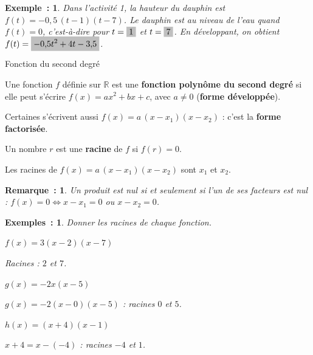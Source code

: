 \documentclass[12pt]{article}
\theoremstyle{break}
\newtheorem*{example}{Exemple~:}
\newtheorem*{examples}{Exemples~:}
\newtheorem*{remark}{Remarque~:}
\theoremstyle{inline}
\begin{document}
\begin{example}
  Dans l'activité 1, la hauteur du dauphin est $f(t) = -0{,}5\,(t - 1)(t - 7)$. Le dauphin est au niveau de l'eau quand $f(t) = 0$, c'est-à-dire pour $t = \hideM{1}$ et $t = \hideM{7}$. En développant, on obtient $f(t) = \hideM{-0{,}5t^2 + 4t - 3{,}5}$.
\end{example}

\begin{definition}{Fonction du second degré}{}
  \begin{multihide}
    Une fonction $f$ définie sur $\mathbb{R}$ est une \textbf{fonction polynôme du second degré} si elle peut s'écrire $f(x) = ax^2 + bx + c$, avec $a \neq 0$ (\textbf{forme développée}).

    Certaines s'écrivent aussi $f(x) = a\,(x - x_1)(x - x_2)$ : c'est la \textbf{forme factorisée}.

    Un nombre $r$ est une \textbf{racine} de $f$ si $f(r) = 0$.
  \end{multihide}
\end{definition}

\begin{proposition}{}{}
  \begin{multihide}
    Les racines de $f(x) = a\,(x - x_1)(x - x_2)$ sont $x_1$ et $x_2$.
  \end{multihide}
\end{proposition}

\begin{remark}
  Un produit est nul si et seulement si l'un de ses facteurs est nul : $f(x) = 0 \iff x - x_1 = 0$ ou $x - x_2 = 0$.
\end{remark}

\begin{examples}
  Donner les racines de chaque fonction.

  \medskip
  \begin{minipage}[t]{0.31\linewidth}
    $f(x) = 3(x - 2)(x - 7)$
    \begin{multihideW}[0.5em]
      Racines : $2$ et $7$.
    \end{multihideW}
  \end{minipage}
  \hfill
  \begin{minipage}[t]{0.31\linewidth}
    $g(x) = -2x(x - 5)$
    \begin{multihideW}[0.5em]
      $g(x) = -2(x - 0)(x - 5)$ : racines $0$ et $5$.
    \end{multihideW}
  \end{minipage}
  \hfill
  \begin{minipage}[t]{0.31\linewidth}
    $h(x) = (x + 4)(x - 1)$
    \begin{multihideW}[0.5em]
      $x + 4 = x - (-4)$ : racines $-4$ et $1$.
    \end{multihideW}
  \end{minipage}
\end{examples}
\end{document}
